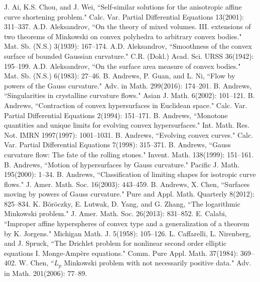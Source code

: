 \documentclass{amsart}
\theoremstyle{definition}
\theoremstyle{remark}
\numberwithin{equation}{section}
\begin{document}
\begin{thebibliography}{10}
J. Ai, K.S. Chou, and J. Wei, ``Self-similar solutions for the anisotropic affine curve shortening problem." Calc. Var. Partial Differential Equations 13(2001): 311--337.
 A.D. Aleksandrov, ``On the theory of mixed volumes. III. extensions of two theorems of Minkowski on convex polyhedra to arbitrary convex bodies." Mat. Sb. (N.S.) 3(1939): 167--174.
 A.D. Aleksandrov, ``Smoothness of the convex surface of bounded Gaussian curvature." C.R. (Dokl.) Acad. Sci. URSS 36(1942): 195--199.
 A.D. Aleksandrov, ``On the surface area measure of convex bodies." Mat. Sb. (N.S.) 6(1983): 27--46.
 B. Andrews, P. Guan, and L. Ni, ``Flow by powers of the Gauss curvature." Adv. in Math. 299(2016): 174--201.
 B. Andrews, ``Singularities in crystalline curvature flows." Asian J. Math. 6(2002): 101--121.
 B. Andrews, ``Contraction of convex hypersurfaces in Euclidean space." Calc. Var. Partial Differential Equations 2(1994): 151--171.
 B. Andrews, ``Monotone quantities and unique limits for evolving convex hypersurfaces." Int. Math. Res. Not. IMRN 1997(1997): 1001--1031.
 B. Andrews, ``Evolving convex curves." Calc. Var. Partial Differential Equations 7(1998): 315--371.
 B. Andrews, ``Gauss curvature flow: The fate of the rolling stones." Invent. Math. 138(1999): 151--161.
 B. Andrews, ``Motion of hypersurfaces by Gauss curvature." Pacific J. Math. 195(2000): 1--34.
 B. Andrews, ``Classification of limiting shapes for isotropic curve flows." J. Amer. Math. Soc. 16(2003): 443--459.
 B. Andrews, X. Chen, ``Surfaces moving by powers of Gauss curvature." Pure and Appl. Math. Quarterly 8(2012): 825--834.
 K. B\"{o}r\"{o}czky, E. Lutwak, D. Yang, and G. Zhang, ``The logarithmic Minkowski problem." J. Amer. Math. Soc. 26(2013): 831--852.
 E. Calabi, ``Improper affine hyperspheres of convex type and a generalization of a theorem by K. Jorgens." Michigan Math. J. 5(1958): 105--126.
  L. Caffarelli, L. Nirenberg, and J. Spruck, ``The Drichlet problem for nonlinear second order elliptic equations I. Monge-Amp\`{e}re equations." Comm. Pure Appl. Math. 37(1984): 369--402.
  W. Chen, ``$L_p$ Minkowski problem with not necessarily positive data." Adv. in Math. 201(2006): 77--89.

\end{thebibliography}
\end{document}
